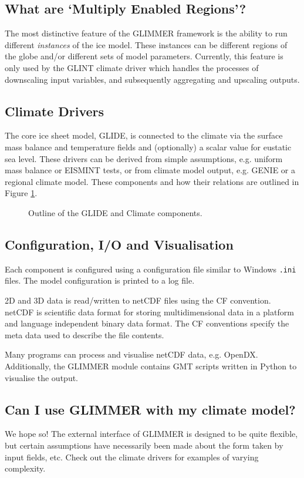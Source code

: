 \subsection{What are `Multiply Enabled Regions'?}
The most distinctive feature of the GLIMMER framework is the ability to run different \emph{instances} of the ice model. These instances can be different regions of the globe and/or different sets of model parameters. Currently, this feature is only used by the GLINT climate driver which handles the processes of downscaling input variables, and subsequently aggregating and upscaling outputs.

\subsection{Climate Drivers}
The core ice sheet model, GLIDE, is connected to the climate via the surface mass balance and temperature fields and (optionally) a scalar value for eustatic sea level. These drivers can be derived from simple assumptions, e.g. uniform mass balance or EISMINT tests, or from climate model output, e.g. GENIE or a regional climate model. These components and how their relations are outlined in Figure \ref{ug.glide}.

\begin{figure}[htbp]
 \begin{center}
 \end{center}
 \caption{Outline of the GLIDE and Climate components.}
\label{ug.glide}
\end{figure}

\subsection{Configuration, I/O and Visualisation}
Each component is configured using a configuration file similar to Windows \texttt{.ini} files. The model configuration is printed to a log file. 

2D and 3D data is read/written to netCDF files using the CF convention. netCDF is scientific data format for storing multidimensional data in a platform and language independent binary data format. The CF conventions specify the meta data used to describe the file contents.

Many programs can process and visualise netCDF data, e.g. OpenDX. Additionally, the GLIMMER module contains GMT scripts written in Python to visualise the output.

\subsection{Can I use GLIMMER with my climate model?}
We hope so! The external interface of GLIMMER is designed to be quite
flexible, but certain assumptions have necessarily been made about the form
taken by input fields, etc. Check out the climate drivers for examples of varying complexity.
